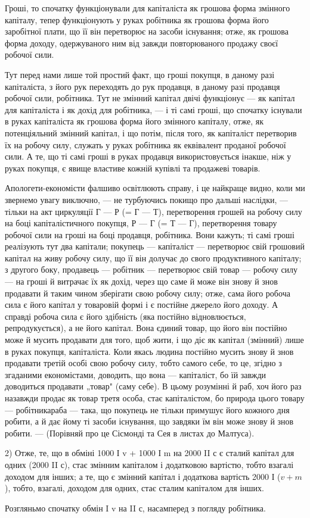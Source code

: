 Гроші, то спочатку функціонували для капіталіста як грошова
форма змінного капіталу, тепер функціонують у руках робітника як
грошова форма його заробітної плати, що її він перетворює на засоби
існування; отже, як грошова форма доходу, одержуваного ним від
завжди повторюваного продажу своєї робочої сили.

Тут перед нами лише той простий факт, що гроші покупця, в
даному разі капіталіста, з його рук переходять до рук продавця, в
даному разі продавця робочої сили, робітника. Тут не змінний капітал
двічі функціонує — як капітал для капіталіста і як дохід для робітника, —
і ті самі гроші, що спочатку існували в руках капіталіста як грошова
форма його змінного капіталу, отже, як потенціяльний змінний капітал, і
що потім, після того, як капіталіст перетворив їх на робочу силу, служать
у руках робітника як еквівалент проданої робочої сили. А те, що ті
самі гроші в руках продавця використовується інакше, ніж у руках покупця,
є явище властиве кожній купівлі та продажеві товарів.

Апологети-економісти фалшиво освітлюють справу, і це найкраще
видно, коли ми звернемо увагу виключно, — не турбуючись покищо про
дальші наслідки, — тільки на акт циркуляції Г — Р (= Г — Т), перетворення
грошей на робочу силу на боці капіталістичного покупця, Р — Г (= Т — Г),
перетворення товару робочої сили на гроші на боці продавця, робітника.
Вони кажуть; ті самі гроші реалізують тут два капітали; покупець —
капіталіст — перетворює свій грошовий капітал на живу робочу силу, що
її він долучає до свого продуктивного капіталу; з другого боку, продавець
— робітник — перетворює свій товар — робочу силу — на гроші й
витрачає їх як дохід, через що саме й може він знову й знов продавати
й таким чином зберігати свою робочу силу; отже, сама його робоча
сила є його капітал у товаровій формі і є постійне джерело його доходу.
А справді робоча сила є його здібність (яка постійно відновлюється,
репродукується), а не його капітал. Вона єдиний товар, що його він
постійно може й мусить продавати для того, щоб жити, і що діє як
капітал (змінний) лише в руках покупця, капіталіста. Коли якась людина
постійно мусить знову й знов продавати третій особі свою робочу силу,
тобто самого себе, то це, згідно з згаданими економістами, доводить,
що вона — капіталіст, бо їй завжди доводиться продавати „товар" (саму
себе). В цьому розумінні й раб, хоч його раз назавжди продає як
товар третя особа, стає капіталістом, бо природа цього товару — робітникараба
— така, що покупець не тільки примушує його кожного дня робити,
а й дає йому ті засоби існування, що завдяки їм він може знову й
знов робити. — (Порівняй про це Сісмонді та Сея в листах до Малтуса).

2) Отже, те, що в обміні 1000 І v + 1000 І m на 2000 II с є сталий
капітал для одних (2000 II с), стає змінним капіталом і додатковою
вартістю, тобто взагалі доходом для інших; а те, що є змінний капітал
і додаткова вартість 2000 І ($v + m$), тобто, взагалі, доходом для одних,
стає сталим капіталом для інших.

Розгляньмо спочатку обмін I v на II с, насамперед з погляду робітника.
